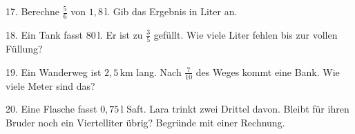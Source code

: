 \documentclass[11pt]{article}
\begin{document}
\begin{pfaufg}{}{17.}{}
Berechne $\frac{5}{6}$ von $1{,}8$\,l. Gib das Ergebnis in Liter an.
\end{pfaufg}

\begin{pfaufg}{}{18.}{}
Ein Tank fasst 80\,l. Er ist zu $\frac{3}{5}$ gefüllt. Wie viele Liter fehlen bis zur vollen Füllung?
\end{pfaufg}

\begin{pfaufg}{}{19.}{}
Ein Wanderweg ist $2{,}5$\,km lang. Nach $\frac{7}{10}$ des Weges kommt eine Bank. Wie viele Meter sind das?
\end{pfaufg}

\begin{pfaufg}{}{20.}{}
Eine Flasche fasst $0{,}75$\,l Saft. Lara trinkt zwei Drittel davon. Bleibt für ihren Bruder noch ein Viertelliter übrig? Begründe mit einer Rechnung.
\end{pfaufg}
\end{document}
